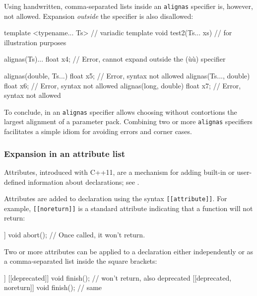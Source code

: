 Using handwritten, comma-separated lists inside an \lstinline!alignas!
specifier is, however, not allowed. Expansion \emph{outside} the
specifier is also disallowed:

\begin{emcppslisting}
template <typename... Ts>    // variadic template
void test2(Ts... xs)          // for illustration purposes
{
    alignas(Ts)... float x4;
        // Error, cannot expand outside the (ù{}ù) specifier

    alignas(double, Ts...) float x5; // Error, syntax not allowed
    alignas(Ts..., double) float x6; // Error, syntax not allowed
    alignas(long, double) float x7;  // Error, syntax not allowed
}
\end{emcppslisting}
    

\noindent To conclude,  in an \lstinline!alignas! specifier
allows choosing without contortions the largest alignment of a parameter
pack. Combining two or more \lstinline!alignas! specifiers facilitates a
simple idiom for avoiding errors and corner cases.

\subsubsection[Expansion in an attribute list]{Expansion in an attribute list}\label{expansion-in-an-attribute-list}

Attributes, introduced with C++11, are a mechanism for adding built-in
or user-defined information about declarations; see
.

Attributes are added to declaration using the syntax
\lstinline![[attribute]]!. For example,\linebreak%
 \lstinline![[noreturn]]! is a standard
attribute indicating that a function will not return:

\begin{emcppslisting}
[[noreturn]] void abort();  // Once called, it won't return.
\end{emcppslisting}
    

\noindent Two or more attributes can be applied to a declaration either
independently or as a comma-separated list inside the square brackets:

\begin{emcppslisting}
[[noreturn]] [[deprecated]] void finish();  // won't return, also deprecated
[[deprecated, noreturn]]    void finish();  // same
\end{emcppslisting}
    

